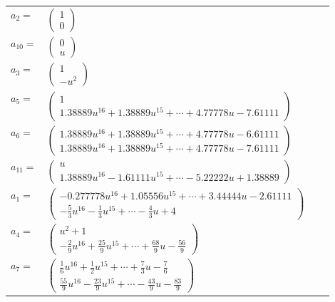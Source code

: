 \documentclass[1p]{elsarticle_modified}
\theoremstyle{definition}
\begin{document}
\begin{tabular}{m{7pt} m{180pt} m{7pt} m{180pt} }
\flushright $a_{2}=$&$\begin{pmatrix}1\\0\end{pmatrix}$ \\
\flushright $a_{10}=$&$\begin{pmatrix}0\\u\end{pmatrix}$ \\
\flushright $a_{3}=$&$\begin{pmatrix}1\\- u^2\end{pmatrix}$ \\
\flushright $a_{5}=$&$\begin{pmatrix}1\\1.38889 u^{16}+1.38889 u^{15}+\cdots+4.77778 u-7.61111\end{pmatrix}$ \\
\flushright $a_{6}=$&$\begin{pmatrix}1.38889 u^{16}+1.38889 u^{15}+\cdots+4.77778 u-6.61111\\1.38889 u^{16}+1.38889 u^{15}+\cdots+4.77778 u-7.61111\end{pmatrix}$ \\
\flushright $a_{11}=$&$\begin{pmatrix}u\\1.38889 u^{16}-1.61111 u^{15}+\cdots-5.22222 u+1.38889\end{pmatrix}$ \\
\flushright $a_{1}=$&$\begin{pmatrix}-0.277778 u^{16}+1.05556 u^{15}+\cdots+3.44444 u-2.61111\\-\frac{5}{3} u^{16}-\frac{1}{3} u^{15}+\cdots-\frac{4}{3} u+4\end{pmatrix}$ \\
\flushright $a_{4}=$&$\begin{pmatrix}u^2+1\\-\frac{2}{9} u^{16}+\frac{25}{9} u^{15}+\cdots+\frac{68}{9} u-\frac{56}{9}\end{pmatrix}$ \\
\flushright $a_{7}=$&$\begin{pmatrix}\frac{1}{6} u^{16}+\frac{1}{2} u^{15}+\cdots+\frac{7}{3} u-\frac{7}{6}\\\frac{55}{9} u^{16}-\frac{23}{9} u^{15}+\cdots-\frac{43}{9} u-\frac{83}{9}\end{pmatrix}$ \\

\end{tabular}
\end{document}
